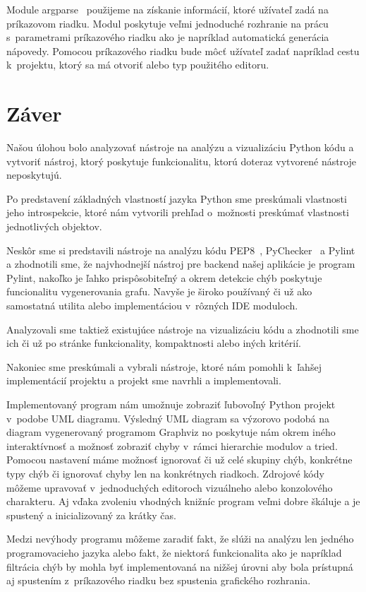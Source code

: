 \documentclass[11pt,oneside,final]{fithesis2}
\begin{document}
		Module argparse~\cite{argparse} použijeme na získanie informácií, ktoré užívateľ zadá na príkazovom riadku. Modul poskytuje veľmi jednoduché rozhranie na prácu s~parametrami príkazového riadku ako je napríklad automatická generácia nápovedy. Pomocou príkazového riadku bude môcť užívateľ zadať napríklad cestu k~projektu, ktorý sa má otvoriť alebo typ použitého editoru.
				
\chapter{Záver}

	Našou úlohou bolo analyzovať nástroje na analýzu a vizualizáciu Python kódu a vytvoriť nástroj, ktorý poskytuje funkcionalitu, ktorú doteraz vytvorené nástroje neposkytujú.
	
	Po predstavení základných vlastností jazyka Python sme preskúmali vlastnosti jeho introspekcie, ktoré nám vytvorili prehľad o~možnosti preskúmať vlastnosti jednotlivých objektov.
	
	Neskôr sme si predstavili nástroje na analýzu kódu PEP8~\cite{pep8}, PyChecker~\cite{pychecker} a Pylint~\cite{pylint} a zhodnotili sme, že najvhodnejší nástroj pre backend našej aplikácie je program Pylint, nakoľko je ľahko prispôsobiteľný a okrem detekcie chýb poskytuje funcionalitu vygenerovania grafu. Navyše je široko používaný či už ako samostatná utilita alebo implementáciou v~rôzných IDE moduloch.
	
	Analyzovali sme taktiež existujúce nástroje na vizualizáciu kódu a zhodnotili sme ich či už po stránke funkcionality, kompaktnosti alebo iných kritérií.
	
	Nakoniec sme preskúmali a vybrali nástroje, ktoré nám pomohli k~ľahšej implementácií projektu a projekt sme navrhli a implementovali.
	
	Implementovaný program nám umožnuje zobraziť ľubovoľný Python projekt v~podobe UML diagramu.  Výsledný UML diagram sa výzorovo podobá na diagram vygenerovaný programom Graphviz\cite{graphviz} no poskytuje nám okrem iného interaktívnosť a možnosť zobraziť chyby v~rámci hierarchie modulov a tried. Pomocou nastavení máme možnosť ignorovať či už celé skupiny chýb, konkrétne typy chýb či ignorovať chyby len na konkrétnych riadkoch. Zdrojové kódy môžeme upravovať v~jednoduchých editoroch vizuálneho alebo konzolového charakteru. Aj vďaka zvoleniu vhodných knižníc program veľmi dobre škáluje a je spustený a inicializovaný za krátky čas.
	
	Medzi nevýhody programu môžeme zaradiť fakt, že slúži na analýzu len jedného programovacieho jazyka alebo fakt, že niektorá funkcionalita ako je napríklad filtrácia chýb by mohla byť implementovaná na nižšej úrovni aby bola prístupná aj spustením z~príkazového riadku bez spustenia grafického rozhrania.
	
\end{document}
